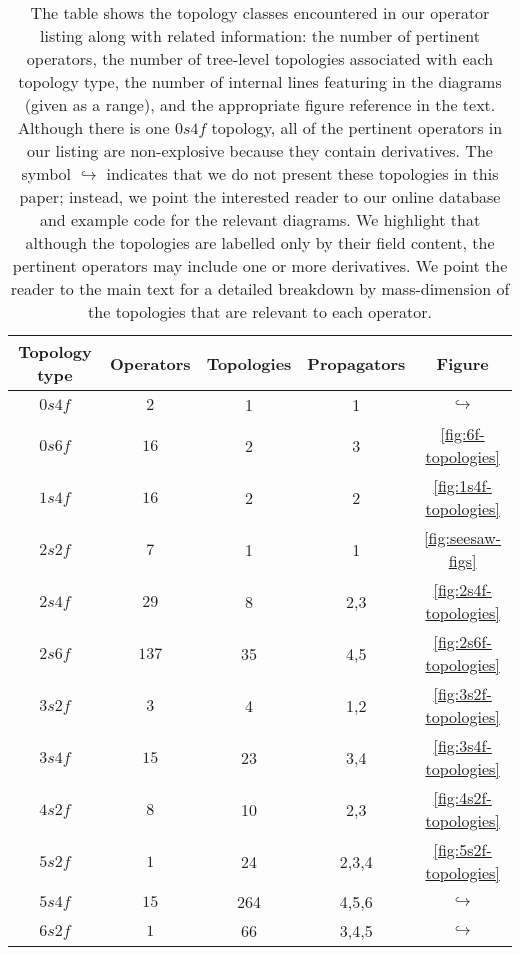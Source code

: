 \begin{table}[t]
  \centering
  \begin{tabular}{ccccc}
    \toprule
    Topology type & Operators & Topologies & Propagators & Figure \\
    \midrule
    $0s4f$        & $2$       & 1          & 1           & $\hookrightarrow$         \\
    $0s6f$        & $16$      & 2          & 3           & \ref{fig:6f-topologies}   \\
    $1s4f$        & $16$      & 2          & 2           & \ref{fig:1s4f-topologies} \\
    $2s2f$        & $7$       & 1          & 1           & \ref{fig:seesaw-figs}     \\
    $2s4f$        & $29$      & 8          & 2,3         & \ref{fig:2s4f-topologies} \\
    $2s6f$        & $137$     & 35         & 4,5         & \ref{fig:2s6f-topologies} \\
    $3s2f$        & $3$       & 4          & 1,2         & \ref{fig:3s2f-topologies} \\
    $3s4f$        & $15$      & 23         & 3,4         & \ref{fig:3s4f-topologies} \\
    $4s2f$        & $8$       & 10         & 2,3         & \ref{fig:4s2f-topologies} \\
    $5s2f$        & $1$       & 24         & 2,3,4       & \ref{fig:5s2f-topologies} \\
    $5s4f$        & $15$      & 264        & 4,5,6       & $\hookrightarrow$         \\
    $6s2f$        & $1$       & 66         & 3,4,5       & $\hookrightarrow$         \\
    \bottomrule
  \end{tabular}
  \caption{The table shows the topology classes encountered in our operator
    listing along with related information: the number of pertinent operators,
    the number of tree-level topologies associated with each topology type, the
    number of internal lines featuring in the diagrams (given as a range), and
    the appropriate figure reference in the text. Although there is one $0s4f$
    topology, all of the pertinent operators in our listing are non-explosive
    because they contain derivatives. The symbol $\hookrightarrow$ indicates
    that we do not present these topologies in this paper; instead, we point the
    interested reader to our online database and example code for the relevant
    diagrams. We highlight that although the topologies are labelled only by
    their field content, the pertinent operators may include one or more
    derivatives. We point the reader to the main text for a detailed breakdown
    by mass-dimension of the topologies that are relevant to each operator.}
  \label{tab:topology-data}
\end{table}

